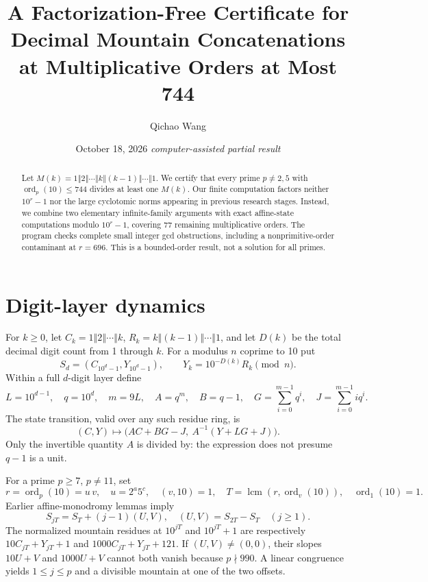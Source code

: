 \documentclass[10pt]{article}
\title{A Factorization-Free Certificate for Decimal Mountain Concatenations\\
at Multiplicative Orders at Most 744}
\author{Qichao Wang}
\date{October 18, 2026 \quad\textit{computer-assisted partial result}}
\DeclareMathOperator{\ord}{ord}
\newcommand{\cat}{\mathbin{\Vert}}
\begin{document}
\maketitle
\begin{abstract}
Let \(M(k)=1\cat2\cat\cdots\cat k\cat(k-1)\cat\cdots\cat1\).
We certify that every prime \(p\ne2,5\) with
\(\ord_p(10)\le744\) divides at least one \(M(k)\).
Our finite computation factors neither \(10^r-1\) nor the large
cyclotomic norms appearing in previous research stages.
Instead, we combine two elementary infinite-family arguments
with exact affine-state computations modulo \(10^r-1\),
covering 77 remaining multiplicative orders.
The program checks complete small integer gcd obstructions,
including a nonprimitive-order contaminant at \(r=696\).
This is a bounded-order result, not a solution for all primes.
\end{abstract}
\section{Digit-layer dynamics}
For \(k\ge0\), let \(C_k=1\cat2\cat\cdots\cat k\),
\(R_k=k\cat(k-1)\cat\cdots\cat1\), and let \(D(k)\) be
the total decimal digit count from 1 through \(k\).
For a modulus \(n\) coprime to 10 put
\[
 S_d=(C_{10^d-1},Y_{10^d-1}),\qquad
 Y_k=10^{-D(k)}R_k\pmod n.
\]
Within a full \(d\)-digit layer define
\[
 L=10^{d-1},\quad q=10^d,\quad m=9L,\quad
 A=q^m,\quad B=q-1,\quad
 G=\sum_{i=0}^{m-1}q^i,\quad J=\sum_{i=0}^{m-1}iq^i.
\]
The state transition, valid over any such residue ring, is
\begin{equation}
 (C,Y)\longmapsto
 \bigl(AC+BG-J,\ A^{-1}(Y+LG+J)\bigr).
 \label{eq:layer}
\end{equation}
Only the invertible quantity \(A\) is divided by:
the expression does not presume \(q-1\) is a unit.

For a prime \(p\ge7\), \(p\ne11\), set
\[
 r=\ord_p(10)=u\,v,\quad u=2^a5^c,\quad (v,10)=1,\quad
 T=\operatorname{lcm}(r,\ord_v(10)),\quad\ord_1(10)=1.
\]
Earlier affine-monodromy lemmas imply
\[
 S_{jT}=S_T+(j-1)(U,V),\quad
 (U,V)=S_{2T}-S_T\quad(j\ge1).
 \label{eq:drift}
\]
The normalized mountain residues at \(10^{jT}\) and
\(10^{jT}+1\) are respectively
\(10C_{jT}+Y_{jT}+1\) and \(1000C_{jT}+Y_{jT}+121\).
If \((U,V)\ne(0,0)\), their slopes
\(10U+V\) and \(1000U+V\) cannot both vanish
because \(p\nmid990\).
A linear congruence yields \(1\le j\le p\) and a
divisible mountain at one of the two offsets.
\end{document}
